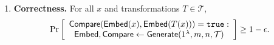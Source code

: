 \documentclass[12pt]{article}
\begin{document}
\begin{definition}
\begin{enumerate}
    \item \textbf{Correctness.} For all $x$ and transformations $T \in \mathcal{T}$,
    \begin{align*}
        \Pr\left[
        \begin{array}{ccc}
            \begin{matrix}
                \mathsf{Compare}(\mathsf{Embed}(x), \mathsf{Embed}(T(x))) = \mathtt{true}: \\
                \mathsf{Embed}, \mathsf{Compare} \gets \mathsf{Generate}(1^\lambda, m, n, \mathcal{T}) \\
            \end{matrix} \\
        \end{array}
        \right] \geq 1 - \epsilon.
    \end{align*}
    

\end{enumerate}
\end{definition}
\end{document}
